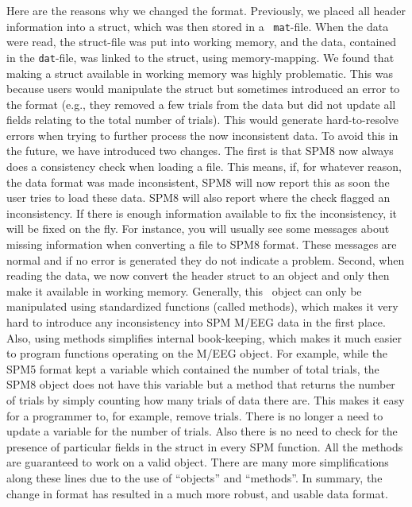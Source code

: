 Here are the reasons why we changed the format. Previously, we placed all header information into a struct, which was then stored in a \matlab\ \texttt{mat}-file. When the data were read, the struct-file was put into working memory, and the data, contained in the \texttt{dat}-file, was linked to the struct, using memory-mapping. We found that making a struct available in working memory was highly problematic. This was because users would manipulate the struct but sometimes introduced an error to the format (e.g., they removed a few trials from the data but did not update all fields relating to the total number of trials). This would generate hard-to-resolve errors when trying to further process the now inconsistent data. To avoid this in the future, we have introduced two changes. The first is that SPM8 now always does a consistency check when loading a file. This means, if, for whatever reason, the data format was made inconsistent, SPM8 will now report this as soon the user tries to load these data. SPM8 will also report where the check flagged an inconsistency. If there is enough information available to fix the inconsistency, it will be fixed on the fly. For instance, you will usually see some messages about missing information when converting a file to SPM8 format. These messages are normal and if no error is generated they do not indicate a problem. Second, when reading the data, we now convert the header struct to an object and only then make it available in working memory. Generally, this \matlab\ object can only be manipulated using standardized functions (called methods), which makes it very hard to introduce any inconsistency into SPM M/EEG data in the first place. Also, using methods simplifies internal book-keeping, which makes it much easier to program functions operating on the M/EEG object. For example, while the SPM5 format kept a variable which contained the number of total trials, the SPM8 object does not have this variable but a method that returns the number of trials by simply counting how many trials of data there are. This makes it easy for a programmer to, for example, remove trials. There is no longer a need to update a variable for the number of trials. Also there is no need to check for the presence of particular fields in the struct in every SPM function. All the methods are guaranteed to work on a valid object. There are many more simplifications along these lines due to the use of ``objects'' and ``methods''. In summary, the change in format has resulted in a much more robust, and usable data format.

